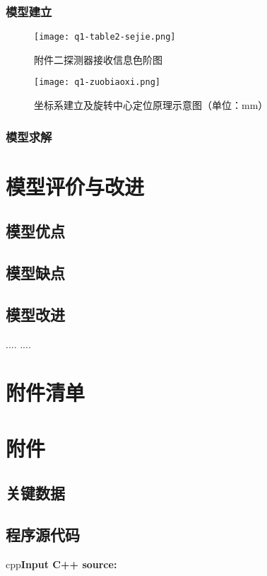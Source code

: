 \documentclass[withoutpreface,bwprint]{cumcmthesis} %
\begin{document}
\subsubsection{模型建立}

\begin{figure}[h]
\small
\centering
\texttt{[image: q1-table2-sejie.png]}
\caption{附件二探测器接收信息色阶图} \label{fig:q1-table2-sejie}
\end{figure}
\begin{figure}[h]
\small
\centering
\texttt{[image: q1-zuobiaoxi.png]}
\caption{坐标系建立及旋转中心定位原理示意图（单位：mm）} \label{fig:q1-zuobiaoxi}
\end{figure}
\subsubsection{模型求解}




\section{模型评价与改进}
\subsection{模型优点}
\subsection{模型缺点}
\subsection{模型改进}



\begin{thebibliography}{9}
  ....
  ....
\end{thebibliography}

\section{附件清单}

\newpage
\section{附件}
\subsection{关键数据}
\subsection{程序源代码}
cpp\textcolor[rgb]{0.98,0.00,0.00}{\textbf{Input C++ source:}}

\end{document}
